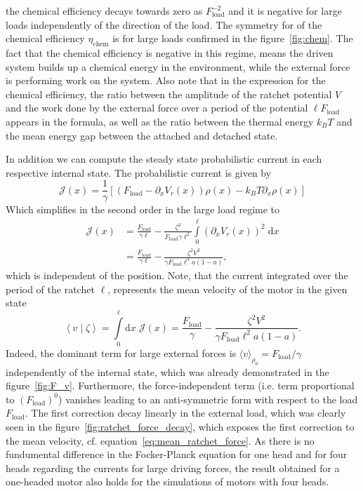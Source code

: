 \documentclass[aps,pre,twocolumn,showpacs,showkeys,superscriptaddress,floatfix]{revtex4-1}
\newcommand{\rmd}{{\mathrm d}}
\begin{document}
the chemical efficiency decays towards zero as $F_\text{load}^{-2}$ and it is negative for large loads independently of the direction of the load.
The symmetry for of the chemical efficiency $\eta_\text{chem}$ is for large loads confirmed in the figure~\ref{fig:chem}. 
The fact that the chemical efficiency is negative in this regime, 
means the driven system builds up a chemical energy in the environment, while the external force is performing work on the system. 
Also note that in the expression for the chemical efficiency, 
the ratio between the amplitude of the ratchet potential $V$ and the work done by the external force over a period of the potential $\ell F_\text{load}$ appears in the formula, 
as well as the ratio between the thermal energy $k_B T$ and the mean energy gap between the attached and detached state. 

In addition we can compute the steady state probabilistic current in each respective internal state.
The probabilistic current is given by 
\[
\mathcal{J}(x) = \frac{1}{\gamma} \left[ \left( F_\text{load} - \partial_x V_r(x) \right) \rho(x) - k_B T \partial_x \rho(x) \right] 
\]
Which simplifies in the second order in the large load regime to
\begin{align*}
\mathcal{J}(x) 
&= \frac{F_\text{load}}{\gamma \ell} - \frac{\zeta^2}{F_\text{load} \gamma \ell^2} \int\limits^\ell_0 \left( \partial_x V_r(x) \right)^2 \; \rmd x \\
&= \frac{F_\text{load}}{\gamma \ell} - \frac{\zeta^2 V^2}{\gamma F_\text{load} \ell^3 a (1-a) } ,
\end{align*}
which is independent of the position. 
Note, that the current integrated over the period of the ratchet $\ell$, represents the mean velocity of the motor in the given state
\[
\left\langle v \middle| \zeta \right\rangle 
= \int\limits_0^\ell \rmd x \; {\mathcal J}(x) 
= \frac{F_\text{load}}{\gamma} - \frac{\zeta^2 V^2}{\gamma F_\text{load} \ell^2 a (1-a) } .
\] 
Indeed, the dominant term for large external forces is $\langle v \rangle_{\rho_0} = F_\text{load} / \gamma$ independently of the internal state, 
which was already demonstrated in the figure~\ref{fig:F_v}. 
Furthermore, the force-independent term (i.e. term proportional to $(F_\text{load})^0$) vanishes leading to an anti-symmetric form with respect to the load $F_\text{load}$. 
The first correction decay linearly in the external load, which was clearly seen in the figure~\ref{fig:ratchet_force_decay}, 
which exposes the first correction to the mean velocity, cf. equation~\eqref{eq:mean_ratchet_force}. 
As there is no fundumental difference in the Focker-Planck equation for one head and for four heads regarding the currents for large driving forces, 
the result obtained for a one-headed motor also holds for the simulations of motors with four heads. 


\end{document}
